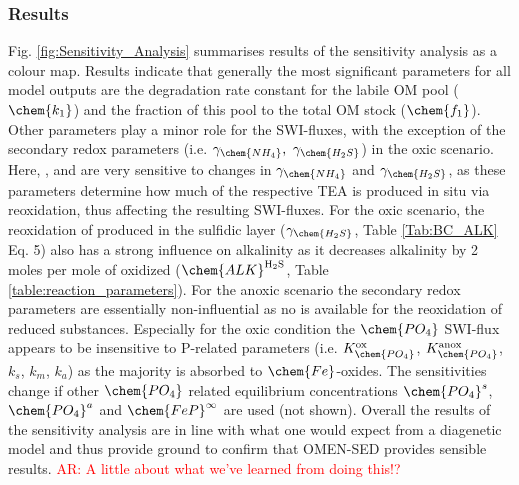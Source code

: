 \documentclass[gmd, manuscript]{copernicus}
\begin{document}
\subsubsection{Results}
Fig. \ref{fig:Sensitivity_Analysis} summarises results of the sensitivity analysis as a colour map. 
Results indicate that generally the most significant parameters for all model outputs are the degradation rate constant for the labile OM pool ($\chem{k_1}$) and the fraction of this pool to the total OM stock ($\chem{f_1}$). 
Other parameters play a minor role for the SWI-fluxes, with the exception of the secondary redox parameters (i.e. $\gamma_\chem{NH_4},\ \gamma_\chem{H_2S}$) in the oxic scenario.
Here, ,  and  are very sensitive to changes in $\gamma_\chem{NH_4}$ and $\gamma_\chem{H_2S}$, as these parameters determine how much of the respective TEA is produced in situ via reoxidation, 
thus affecting the resulting SWI-fluxes. For the oxic scenario, the reoxidation of  produced in the sulfidic layer ($\gamma_\chem{H_2S}$, Table \ref{Tab:BC_ALK} Eq. 5) 
also has a strong influence on alkalinity as it decreases alkalinity by 2 moles per mole of  oxidized ($\chem{ALK}^\mathrm{H_2S}$, Table \ref{table:reaction_parameters}). 
For the anoxic scenario the secondary redox parameters are essentially non-influential as no  is available for the reoxidation of reduced substances. 
Especially for the oxic condition the $\chem{PO_4}$ SWI-flux appears to be insensitive to P-related parameters (i.e. $K_\chem{PO_4}^\mathrm{ox}$, $K_\chem{PO_4}^\mathrm{anox}$, $k_s$, $k_m$, $k_a$) as the majority is absorbed to $\chem{Fe}$-oxides. 
The sensitivities change if other $\chem{PO_4}$ related equilibrium concentrations $\chem{PO_4}^s$, $\chem{PO_4}^a$ and $\chem{FeP}^\infty$ are used (not shown).
Overall the results of the sensitivity analysis are in line with what one would expect from a diagenetic model and thus provide ground to confirm that OMEN-SED provides sensible results.
\textcolor{red}{AR: A little about what we've learned from doing this!?}

\end{document}
